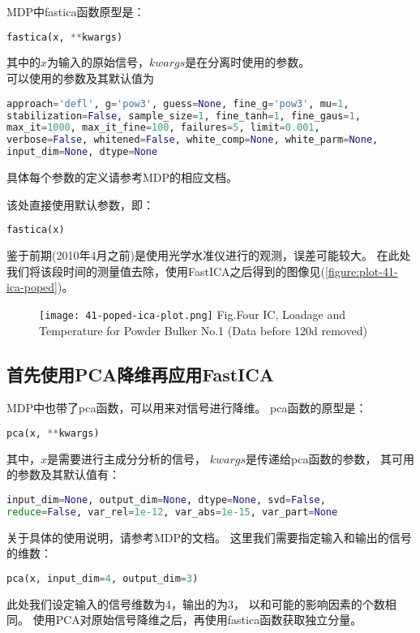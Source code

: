 MDP中fastica函数原型是：
\begin{lstlisting}[language=Python, basicstyle=\ttfamily]
fastica(x, **kwargs)
\end{lstlisting}
其中的$x$为输入的原始信号，$kwargs$是在分离时使用的参数。\\
可以使用的参数及其默认值为
\begin{lstlisting}[language=Python, basicstyle=\ttfamily]
approach='defl', g='pow3', guess=None, fine_g='pow3', mu=1, 
stabilization=False, sample_size=1, fine_tanh=1, fine_gaus=1,
max_it=1000, max_it_fine=100, failures=5, limit=0.001, 
verbose=False, whitened=False, white_comp=None, white_parm=None,
input_dim=None, dtype=None
\end{lstlisting}
具体每个参数的定义请参考MDP的相应文档。

该处直接使用默认参数，即：
\begin{lstlisting}[language=Python, basicstyle=\ttfamily]
fastica(x)
\end{lstlisting}

鉴于前期(2010年4月之前)是使用光学水准仪进行的观测，误差可能较大。
在此处我们将该段时间的测量值去除，使用FastICA之后得到的图像见(\ref{figure:plot-41-ica-poped})。
\begin{figure}[!htbp]
   \centering
   \texttt{[image: 41-poped-ica-plot.png]}
			{Fig.}{Four IC, Loadage and Temperature for Powder Bulker No.1 (Data before 120d removed)}
\end{figure}


\subsection{首先使用PCA降维再应用FastICA}
MDP中也带了pca函数，可以用来对信号进行降维。
pca函数的原型是：
\begin{lstlisting}[language=Python, basicstyle=\ttfamily]
pca(x, **kwargs)
\end{lstlisting}
其中，$x$是需要进行主成分分析的信号，
$kwargs$是传递给pca函数的参数，
其可用的参数及其默认值有：
\begin{lstlisting}[language=Python, basicstyle=\ttfamily]
input_dim=None, output_dim=None, dtype=None, svd=False, 
reduce=False, var_rel=1e-12, var_abs=1e-15, var_part=None
\end{lstlisting}
关于具体的使用说明，请参考MDP的文档。
这里我们需要指定输入和输出的信号的维数：
\begin{lstlisting}[language=Python, basicstyle=\ttfamily]
pca(x, input_dim=4, output_dim=3)
\end{lstlisting}
此处我们设定输入的信号维数为4，输出的为3，
以和可能的影响因素的个数相同。
使用PCA对原始信号降维之后，再使用fastica函数获取独立分量。

